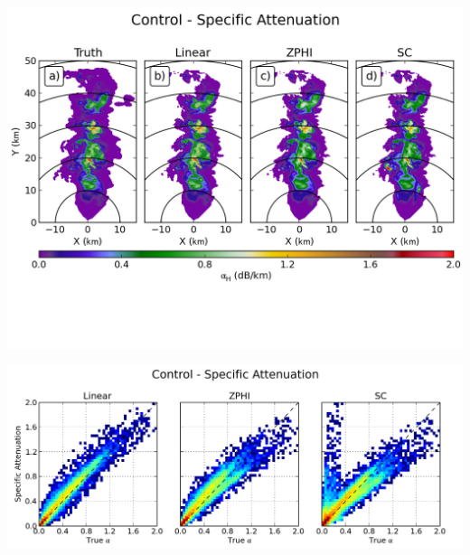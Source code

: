 \documentclass[red]{beamer}
\begin{document}
\begin{frame}
	\begin{center}
		\includegraphics[scale=0.55]{figures/C_Control_Specific_Attenuation.png}
	\end{center}
\end{frame}

\begin{frame}
	\begin{center}
		\includegraphics[scale=0.45]{figures/C_Control_Specific_Attenuation_scatter.png}
	\end{center}
\end{frame}
\end{document}

